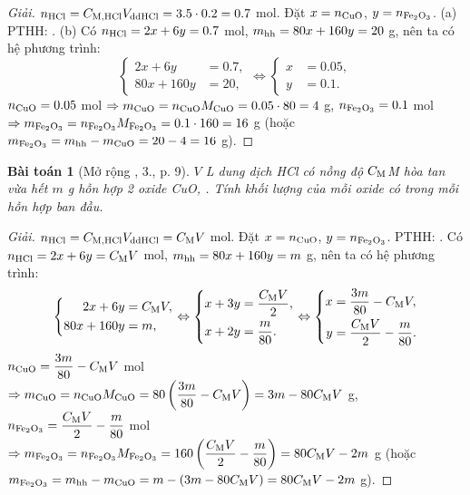 \documentclass{article}
\newtheorem{baitoan}{Bài toán}
\begin{document}
\begin{proof}[Giải]
	$n_{\rm HCl} = C_{\rm M,HCl}V_{\rm ddHCl} = 3.5\cdot0.2 = 0.7$ mol. Đặt $x = n_{\rm CuO}$, $y = n_{\ce{Fe2O3}}$. (a) PTHH: . (b) Có $n_{\rm HCl} = 2x + 6y = 0.7$ mol, $m_{\rm hh} = 80x + 160y = 20$ g, nên ta có hệ phương trình:
	\begin{equation*}
		\left\{\begin{split}
			2x + 6y &= 0.7,\\
			80x + 160y &= 20,
		\end{split}\right.\Leftrightarrow\left\{\begin{split}
			x &= 0.05,\\
			y &= 0.1.
		\end{split}\right.
	\end{equation*}
	$n_{\rm CuO} = 0.05$ mol $\Rightarrow m_{\rm CuO} = n_{\rm CuO}M_{\rm CuO} = 0.05\cdot80 = 4$ g, $n_{\ce{Fe2O3}} = 0.1$ mol $\Rightarrow m_{\ce{Fe2O3}} = n_{\ce{Fe2O3}}M_{\ce{Fe2O3}} = 0.1\cdot160 = 16$ g (hoặc $m_{\ce{Fe2O3}} = m_{\rm hh} - m_{\rm CuO} = 20 - 4 = 16$ g).
\end{proof}

\begin{baitoan}[Mở rộng \cite{SGK_Hoa_Hoc_9}, 3., p. 9]
	$V$ \emph{L} dung dịch \emph{HCl} có nồng độ $C_{\rm M}$\emph{M} hòa tan vừa hết $m$ \emph{g} hỗn hợp 2 oxide \emph{CuO, }. Tính khối lượng của mỗi oxide có trong mỗi hỗn hợp ban đầu.
\end{baitoan}

\begin{proof}[Giải]
	$n_{\rm HCl} = C_{\rm M,HCl}V_{\rm ddHCl} = C_{\rm M}V$ mol. Đặt $x = n_{\rm CuO}$, $y = n_{\ce{Fe2O3}}$. PTHH: . Có $n_{\rm HCl} = 2x + 6y = C_{\rm M}V$ mol, $m_{\rm hh} = 80x + 160y = m$ g, nên ta có hệ phương trình:
	\begin{equation*}
		\left\{\begin{split}
			2x + 6y &= C_{\rm M}V,\\
			80x + 160y &= m,
		\end{split}\right.\Leftrightarrow\left\{\begin{split}
			x + 3y &= \frac{C_{\rm M}V}{2},\\
			x + 2y &= \frac{m}{80}.
		\end{split}\right.\Leftrightarrow\left\{\begin{split}
			x &= \frac{3m}{80} - C_{\rm M}V,\\
			y &= \frac{C_{\rm M}V}{2} - \frac{m}{80}.
		\end{split}\right.
	\end{equation*}
	$n_{\rm CuO} = \dfrac{3m}{80} - C_{\rm M}V$ mol $\Rightarrow m_{\rm CuO} = n_{\rm CuO}M_{\rm CuO} = 80\left(\dfrac{3m}{80} - C_{\rm M}V\right) = 3m - 80C_{\rm M}V$ g, $n_{\ce{Fe2O3}} = \dfrac{C_{\rm M}V}{2} - \dfrac{m}{80}$ mol $\Rightarrow m_{\ce{Fe2O3}} = n_{\ce{Fe2O3}}M_{\ce{Fe2O3}} = 160\left(\dfrac{C_{\rm M}V}{2} - \dfrac{m}{80}\right) = 80C_{\rm M}V - 2m$ g (hoặc $m_{\ce{Fe2O3}} = m_{\rm hh} - m_{\rm CuO} = m - (3m - 80C_{\rm M}V) = 80C_{\rm M}V - 2m$ g).
\end{proof}
\end{document}
